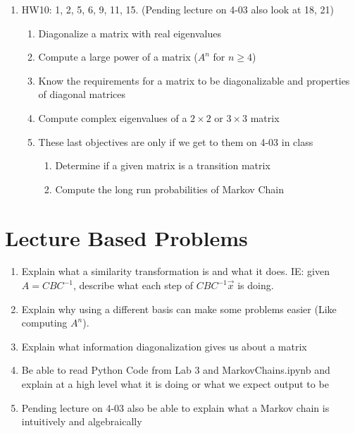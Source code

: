 \documentclass[12pt]{exam}
\begin{document}
\begin{enumerate}
\begin{enumerate}
        \end{enumerate}
    \item HW10: 1, 2, 5, 6, 9, 11, 15. (Pending lecture on 4-03 also look at 18, 21)
        \begin{enumerate}
            \item Diagonalize a matrix with real eigenvalues
            \item Compute a large power of a matrix ($A^n$ for $n\geq 4$)
            \item Know the requirements for a matrix to be diagonalizable and properties of diagonal matrices
            \item Compute complex eigenvalues of a $2\times 2$ or $3\times 3$ matrix
            \item These last objectives are only if we get to them on 4-03 in class
                \begin{enumerate}
                    \item Determine if a given matrix is a transition matrix
                    \item Compute the long run probabilities of Markov Chain
                \end{enumerate}
        \end{enumerate}
\end{enumerate}
\section{Lecture Based Problems}
\begin{enumerate}
    \item Explain what a similarity transformation is and what it does. IE: given $A = CBC^{-1}$, describe
        what each step of $CBC^{-1}\vec{x}$ is doing.
    \item Explain why using a different basis can make some problems easier (Like computing $A^n$).
    \item Explain what information diagonalization gives us about a matrix
    \item Be able to read Python Code from Lab 3 and MarkovChains.ipynb and explain at a high level
        what it is doing or what we expect output to be
    \item Pending lecture on 4-03 also be able to explain what a Markov chain is intuitively and algebraically
\end{enumerate}
\end{document}
